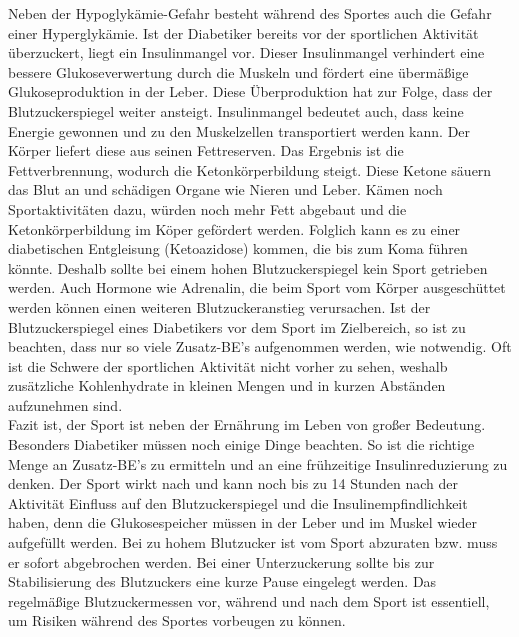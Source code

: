 	Neben der Hypoglykämie-Gefahr besteht während des Sportes auch die Gefahr einer Hyperglykämie. Ist der Diabetiker bereits vor der sportlichen Aktivität überzuckert, liegt ein Insulinmangel vor. Dieser Insulinmangel verhindert eine bessere Glukoseverwertung durch die Muskeln und fördert eine übermäßige Glukoseproduktion in der Leber. Diese Überproduktion hat zur Folge, dass der Blutzuckerspiegel weiter ansteigt. Insulinmangel bedeutet auch, dass keine Energie gewonnen und zu den Muskelzellen transportiert werden kann. Der Körper liefert diese aus seinen Fettreserven. Das Ergebnis ist die Fettverbrennung, wodurch die Ketonkörperbildung steigt. Diese Ketone säuern das Blut an und schädigen Organe wie Nieren und Leber. Kämen noch Sportaktivitäten dazu, würden noch mehr Fett abgebaut und die Ketonkörperbildung im Köper gefördert werden. Folglich kann es zu einer diabetischen Entgleisung (Ketoazidose) kommen, die bis zum Koma führen könnte. Deshalb sollte bei einem hohen Blutzuckerspiegel kein Sport getrieben werden. Auch Hormone wie Adrenalin, die beim Sport vom Körper ausgeschüttet werden können einen weiteren Blutzuckeranstieg verursachen. \newline
	Ist der Blutzuckerspiegel eines Diabetikers vor dem Sport im Zielbereich, so ist zu beachten, dass nur so viele Zusatz-BE’s aufgenommen werden, wie notwendig. Oft ist die Schwere der sportlichen Aktivität nicht vorher zu sehen, weshalb zusätzliche Kohlenhydrate in kleinen Mengen und in kurzen Abständen aufzunehmen sind.\cite{SG}\\
	Fazit ist, der Sport ist neben der Ernährung im Leben von großer Bedeutung. Besonders Diabetiker müssen noch einige Dinge beachten. So ist die richtige Menge an Zusatz-BE’s zu ermitteln und an eine frühzeitige Insulinreduzierung zu denken. Der Sport wirkt nach und kann noch bis zu 14 Stunden nach der Aktivität Einfluss auf den Blutzuckerspiegel und die Insulinempfindlichkeit haben, denn die Glukosespeicher müssen in der Leber und im Muskel wieder aufgefüllt werden. Bei zu hohem Blutzucker ist vom Sport abzuraten bzw. muss er sofort abgebrochen werden. Bei einer Unterzuckerung sollte bis zur Stabilisierung des Blutzuckers eine kurze Pause eingelegt werden. Das regelmäßige Blutzuckermessen vor, während und nach dem Sport ist essentiell, um Risiken während des Sportes vorbeugen zu können. \cite{SG}

